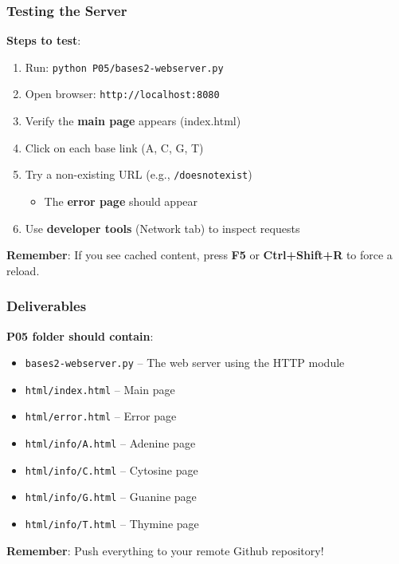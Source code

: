 \documentclass[xcolor=table]{beamer}
\begin{document}
\begin{frame}
\frametitle{Testing the Server}

\textbf{Steps to test}:

\begin{enumerate}
\item Run: \texttt{python P05/bases2-webserver.py}
\item Open browser: \texttt{http://localhost:8080}
\item Verify the \textbf{main page} appears (index.html)
\item Click on each base link (A, C, G, T)
\item Try a non-existing URL (e.g., \texttt{/doesnotexist})
  \begin{itemize}
  \item The \textbf{error page} should appear
  \end{itemize}
\item Use \textbf{developer tools} (Network tab) to inspect requests
\end{enumerate}

\vspace{0.3cm}

\textbf{Remember}: If you see cached content, press \textbf{F5} or \textbf{Ctrl+Shift+R} to force a reload.

\end{frame}

\begin{frame}
\frametitle{Deliverables}

\textbf{P05 folder should contain}:

\vspace{0.2cm}

\begingroup\small
\begin{itemize}
\item \texttt{bases2-webserver.py} -- The web server using the HTTP module
\item \texttt{html/index.html} -- Main page
\item \texttt{html/error.html} -- Error page
\item \texttt{html/info/A.html} -- Adenine page
\item \texttt{html/info/C.html} -- Cytosine page
\item \texttt{html/info/G.html} -- Guanine page
\item \texttt{html/info/T.html} -- Thymine page
\end{itemize}
\endgroup

\vspace{0.3cm}

\textbf{Remember}: Push everything to your remote Github repository!

\end{frame}
\end{document}
